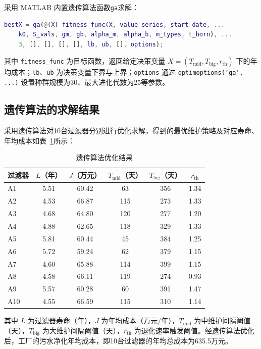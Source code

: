 \documentclass[withoutpreface,bwprint]{cumcmthesis}
\begin{document}
\vspace*{-5pt}
采用 MATLAB 内置遗传算法函数\texttt{ga}求解：
\begin{lstlisting}[language=Matlab, basicstyle=\small\ttfamily]
	bestX = ga(@(X) fitness_func(X, value_series, start_date, ...
	k0, S_vals, gm, gb, alpha_m, alpha_b, m_types, t_born), ...
	3, [], [], [], [], lb, ub, [], options);
\end{lstlisting}
其中 \texttt{fitness\_func} 为目标函数，返回给定决策变量 $X = (T_{\text{mid}}, T_{\text{big}}, r_{\text{th}})$ 下的年均成本；\texttt{lb}、\texttt{ub} 为决策变量下界与上界；\texttt{options} 通过 \texttt{optimoptions('ga', ...)} 设置种群规模为30、最大进化代数为25等参数。

\subsection{遗传算法的求解结果}

采用遗传算法对10台过滤器分别进行优化求解，得到的最优维护策略及对应寿命、年均成本如表~\ref{tab:遗传算法结果}所示：

\begin{table}[H]
	\centering
	\setlength{\tabcolsep}{6pt}
	\renewcommand{\arraystretch}{1.2}
	\caption{遗传算法优化结果}
	\label{tab:遗传算法结果}
	\begin{tabular}{lccccc}
		\toprule
		\textbf{过滤器} & \textbf{$L$（年）} & \textbf{$J$（万元）} & \textbf{$T_{\text{mid}}$（天）} & \textbf{$T_{\text{big}}$（天）} & \textbf{$r_{\text{th}}$} \\
		\midrule
		\rowcolor{LightBlue}
		A1 & 5.51 & 60.42 & 63 & 356 & 1.34 \\
		A2 & 4.53 & 66.87 & 115 & 273 & 1.33 \\
		\rowcolor{LightBlue}
		A3 & 4.68 & 64.80 & 120 & 277 & 1.20 \\
		A4 & 4.88 & 62.65 & 118 & 329 & 1.33 \\
		\rowcolor{LightBlue}
		A5 & 5.81 & 60.44 & 45 & 384 & 1.25 \\
		A6 & 5.72 & 59.24 & 62 & 379 & 1.15 \\
		\rowcolor{LightBlue}
		A7 & 4.60 & 65.88 & 114 & 399 & 1.15 \\
		A8 & 4.58 & 66.11 & 119 & 274 & 0.93 \\
		\rowcolor{LightBlue}
		A9 & 5.57 & 60.28 & 60 & 391 & 1.47 \\
		A10 & 4.55 & 66.59 & 115 & 310 & 1.14 \\
		\bottomrule
	\end{tabular}
\end{table}
其中 $L$ 为过滤器寿命（年），$J$ 为年均成本（万元/年），$T_{\text{mid}}$ 为中维护间隔阈值（天），$T_{\text{big}}$ 为大维护间隔阈值（天），$r_{\text{th}}$ 为退化速率触发阈值。经遗传算法优化后，工厂的污水净化年均成本，即10台过滤器的年均总成本为635.5万元。
\end{document}
